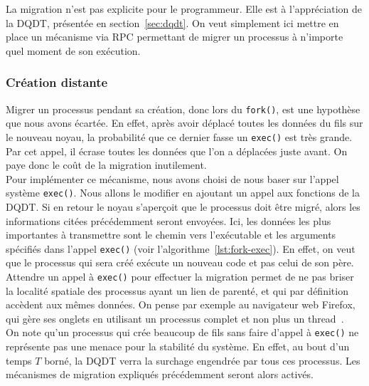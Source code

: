         La migration n'est pas explicite pour le programmeur. Elle est à
        l'appréciation de la DQDT, présentée en section~\ref{sec:dqdt}. On veut
        simplement ici mettre en place un mécanisme via RPC permettant de migrer
        un processus à n'importe quel moment de son exécution.

      \subsubsection{Création distante}

        Migrer un processus pendant sa création, donc lors du \texttt{fork()},
        est une hypothèse que nous avons écartée. En effet, après avoir déplacé
        toutes les données du fils sur le nouveau noyau, la probabilité que ce
        dernier fasse un \texttt{exec()} est très grande. Par cet appel, il
        écrase toutes les données que l'on a déplacées juste avant. On paye donc
        le coût de la migration inutilement.\\

        Pour implémenter ce mécanisme, nous avons choisi de nous baser sur
        l'appel système \texttt{exec()}. Nous allons le modifier en ajoutant un
        appel aux fonctions de la DQDT. Si en retour le noyau s'aperçoit que le
        processus doit être migré, alors les informations citées précédemment
        seront envoyées. Ici, les données les plus importantes à transmettre
        sont le chemin vers l'exécutable et les arguments spécifiés dans l'appel
        \texttt{exec()} (voir l'algorithme~\ref{lst:fork-exec}). En effet, on
        veut que le processus qui sera créé exécute un nouveau code et pas celui
        de son père.\\

        Attendre un appel à \texttt{exec()} pour effectuer la migration permet
        de ne pas briser la localité spatiale des processus ayant un lien de
        parenté, et qui par définition accèdent aux mêmes données. On pense par
        exemple au navigateur web Firefox, qui gère ses onglets en utilisant un
        processus complet et non plus un thread~\citep{mozillaElectrolysis}.\\

        On note qu'un processus qui crée beaucoup de fils sans faire d'appel à
        \texttt{exec()} ne représente pas une menace pour la stabilité du
        système. En effet, au bout d'un temps $T$ borné, la DQDT verra la
        surchage engendrée par tous ces processus. Les mécanismes de migration
        expliqués précédemment seront alors activés.

